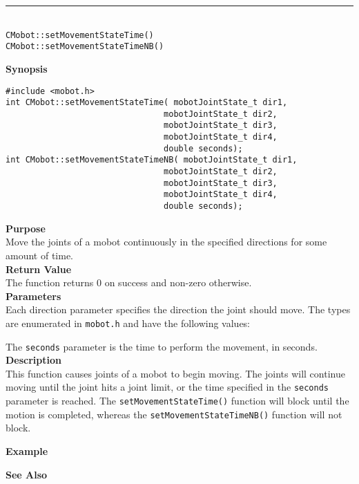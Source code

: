 \noindent
\vspace{5pt}
\rule{4.5in}{0.015in}\\
\noindent
{\LARGE \texttt{CMobot::setMovementStateTime()}}\\
{\LARGE \texttt{CMobot::setMovementStateTimeNB()}}\\
{}

\noindent
{\bf Synopsis}
\vspace{-8pt}
\begin{verbatim}
#include <mobot.h>
int CMobot::setMovementStateTime( mobotJointState_t dir1, 
                                mobotJointState_t dir2, 
                                mobotJointState_t dir3, 
                                mobotJointState_t dir4, 
                                double seconds);
int CMobot::setMovementStateTimeNB( mobotJointState_t dir1, 
                                mobotJointState_t dir2, 
                                mobotJointState_t dir3, 
                                mobotJointState_t dir4, 
                                double seconds);
\end{verbatim}

\noindent
{\bf Purpose}\\
Move the joints of a mobot continuously in the specified directions for some amount of time.\\

\noindent
{\bf Return Value}\\
The function returns 0 on success and non-zero otherwise.\\

\noindent
{\bf Parameters}\\
Each direction parameter specifies the direction the joint should move. The types
are enumerated in \texttt{mobot.h} and have the following values:

The \texttt{seconds} parameter is the time to perform the movement, in seconds.
\\

\noindent
{\bf Description}\\
This function causes joints of a mobot to begin moving. The joints will continue moving
until the joint hits a joint limit, or the time specified in the \texttt{seconds} parameter
is reached. The \texttt{setMovementStateTime()} function will block until the motion is completed, 
whereas the \texttt{setMovementStateTimeNB()} function will not block. 

\noindent
{\bf Example}\\
\noindent

\noindent
{\bf See Also}\\

